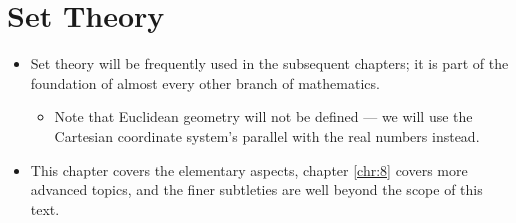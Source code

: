 \documentclass[../main.tex]{subfiles}
\begin{document}
\chapter{Set Theory}
\begin{itemize}
    \item {}Set theory will be frequently used in the subsequent chapters; it is part of the foundation of almost every other branch of mathematics.
    \begin{itemize}
        \item Note that Euclidean geometry will not be defined --- we will use the Cartesian coordinate system's parallel with the real numbers instead.
    \end{itemize}
    \item This chapter covers the elementary aspects, chapter \ref{chr:8} covers more advanced topics, and the finer subtleties are well beyond the scope of this text.
\end{itemize}
\end{document}
